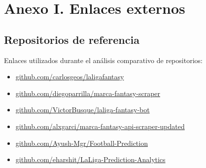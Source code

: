 \section*{Anexo I. Enlaces externos}

\subsection{Repositorios de referencia}

Enlaces utilizados durante el análisis comparativo de repositorios:

\begin{itemize}
\item \href{https://github.com/carlosgeos/laligafantasy}{github.com/carlosgeos/laligafantasy}
\item \href{https://github.com/diegoparrilla/marca-fantasy-scraper}{github.com/diegoparrilla/marca-fantasy-scraper}
\item \href{https://github.com/VictorBusque/laliga-fantasy-bot}{github.com/VictorBusque/laliga-fantasy-bot}
\item \href{https://github.com/alxgarci/marca-fantasy-api-scraper-updated}{github.com/alxgarci/marca-fantasy-api-scraper-updated}
\item \href{https://github.com/Ayush-Mgr/Football-Prediction}{github.com/Ayush-Mgr/Football-Prediction}
\item \href{https://github.com/eharshit/LaLiga-Prediction-Analytics}{github.com/eharshit/LaLiga-Prediction-Analytics}
\end{itemize}
